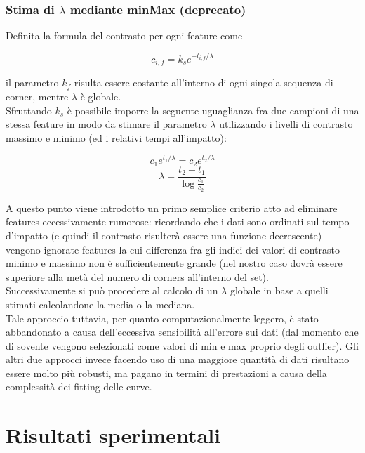 \documentclass[12pt]{report}
\begin{document}
\subsection{Stima di $\lambda$ mediante minMax (deprecato)}

\noindent Definita la formula del contrasto per ogni feature come

$$ c_{i,f} = k_se^{-t_{i,f}/\lambda} $$

\noindent il parametro $k_f$ risulta essere costante all'interno di ogni singola sequenza di corner, mentre $\lambda$ \`e globale.\\
\noindent Sfruttando $k_s$ \`e possibile imporre la seguente uguaglianza fra due campioni di una stessa feature in modo da stimare il parametro $\lambda$ utilizzando i livelli di contrasto massimo e minimo (ed i relativi tempi all'impatto):

$$ c_1e^{t_1/\lambda} = c_2e^{t_2/\lambda} $$
$$ \lambda = \frac{t_2-t_1}{\log\frac{c_1}{c_2}} $$

\noindent A questo punto viene introdotto un primo semplice criterio atto ad eliminare features eccessivamente rumorose: ricordando che i dati sono ordinati sul tempo d'impatto (e quindi il contrasto risulter\`a essere una funzione decrescente) vengono ignorate features la cui differenza fra gli indici dei valori di contrasto minimo e massimo non \`e sufficientemente grande (nel nostro caso dovr\`a essere superiore alla met\`a del numero di corners all'interno del set).\\

\noindent Successivamente si pu\`o procedere al calcolo di un $\lambda$ globale in base a quelli stimati calcolandone la media o la mediana.\\

\noindent Tale approccio tuttavia, per quanto computazionalmente leggero, \`e stato abbandonato a causa dell'eccessiva sensibilit\`a all'errore sui dati (dal momento che di sovente vengono selezionati come valori di min e max proprio degli outlier). Gli altri due approcci invece facendo uso di una maggiore quantit\`a di dati risultano essere molto pi\`u robusti, ma pagano in termini di prestazioni a causa della complessit\`a dei fitting delle curve.






\chapter{Risultati sperimentali}
\end{document}

